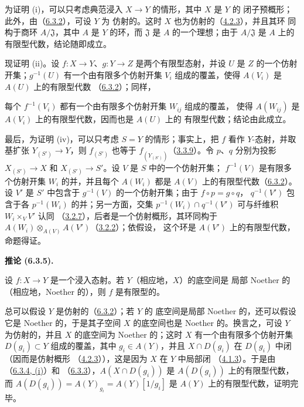 \documentclass[UTF8,fontset=none,11pt,oneside,openany]{ctexbook}
\newenvironment{corollary}[1][]{%
  \par\medskip\noindent\textbf{推论 (#1).}\ %
}{\par}
\newcommand{\oldpage}[2][]{%
  \hypertarget{ega-source-page-#1-#2}{}%
  \marginnote{\scriptsize\textbf{#1}~|~#2}\ignorespaces}
\let\EGAOriginalLabel\label
\renewcommand{\label}[1]{\phantomsection\EGAOriginalLabel{#1}}
\begin{document}
为证明 (i)，可以只考虑典范浸入 $X\to Y$ 的情形，其中 $X$ 是 $Y$ 的
闭子预概形；此外，由（\hyperref[I.6.3.2-fr]{6.3.2}），可设 $Y$ 为
仿射的。这时 $X$ 也为仿射的（\hyperref[I.4.2.3-fr]{4.2.3}），并且其环
同构于商环 $A/\mathfrak{J}$，其中 $A$ 是 $Y$ 的环，而
$\mathfrak{J}$ 是 $A$ 的一个理想；由于 $A/\mathfrak{J}$ 是 $A$ 上的
有限型代数，结论随即成立。

现证明 (ii)。设 $f:X\to Y$、$g:Y\to Z$ 是两个有限型态射，并设 $U$
是 $Z$ 的一个仿射开集；$g^{-1}(U)$ 有一个由有限多个仿射开集 $V_i$
组成的覆盖，使得 $A(V_i)$ 是 $A(U)$ 上的有限型代数
（\hyperref[I.6.3.2-fr]{6.3.2}）；同样，

\oldpage[I]{146}
每个 $f^{-1}(V_i)$ 都有一个由有限多个仿射开集 $W_{ij}$ 组成的覆盖，
使得 $A(W_{ij})$ 是 $A(V_i)$ 上的有限型代数，因而也是 $A(U)$ 上的
有限型代数；结论由此成立。

最后，为证明 (iv)，可以只考虑 $S=Y$ 的情形；事实上，把 $f$ 看作
$Y$-态射，并取基扩张 $Y_{(S')}\to Y$，则 $f_{(S')}$ 也等于
$f_{(Y_{(S')})}$（\hyperref[I.3.3.9-fr]{3.3.9}）。令 $p$、$q$ 分别为投影
$X_{(S')}\to X$ 和 $X_{(S')}\to S'$。设 $V$ 是 $S$ 中的一个仿射开集；
$f^{-1}(V)$ 是有限多个仿射开集 $W_i$ 的并，并且每个 $A(W_i)$ 都是
$A(V)$ 上的有限型代数（\hyperref[I.6.3.2-fr]{6.3.2}）。设 $V'$ 是
$S'$ 中包含于 $g^{-1}(V)$ 的一个仿射开集；由于 $f\circ p=g\circ q$，
$q^{-1}(V')$ 包含于各 $p^{-1}(W_i)$ 的并；另一方面，交集
$p^{-1}(W_i)\cap q^{-1}(V')$ 可与纤维积 $W_i\times_V V'$ 认同
（\hyperref[I.3.2.7-fr]{3.2.7}），后者是一个仿射概形，其环同构于
$A(W_i)\otimes_{A(V)}A(V')$（\hyperref[I.3.2.2-fr]{3.2.2}）；依假设，
这个环是 $A(V')$ 上的有限型代数，命题得证。

\begin{corollary}[6.3.5]
\label{I.6.3.5-fr}
设 $f:X\to Y$ 是一个浸入态射。若 $Y$（相应地，$X$）的底空间是
局部 Noether 的（相应地，Noether 的），则 $f$ 是有限型的。
\end{corollary}

总可以假设 $Y$ 是仿射的（\hyperref[I.6.3.2-fr]{6.3.2}）；若 $Y$ 的
底空间是局部 Noether 的，还可以假设它是 Noether 的，于是其子空间
$X$ 的底空间也是 Noether 的。换言之，可设 $Y$ 为仿射的，并且 $X$
的底空间为 Noether 的；这时 $X$ 有一个由有限多个仿射开集
$D(g_i)\subset Y$ 组成的覆盖，其中 $g_i\in A(Y)$，并且
$X\cap D(g_i)$ 在 $D(g_i)$ 中闭（因而是仿射概形
（\hyperref[I.4.2.3-fr]{4.2.3}）），这是因为 $X$ 在 $Y$ 中局部闭
（\hyperref[I.4.1.3-fr]{4.1.3}）。于是由
（\hyperref[I.6.3.4-fr]{6.3.4, (i)}）和
（\hyperref[I.6.3.3-fr]{6.3.3}），$A(X\cap D(g_i))$ 是
$A(D(g_i))$ 上的有限型代数，而
$A(D(g_i))=A(Y)_{g_i}=A(Y)[1/g_i]$ 是 $A(Y)$ 上的有限型代数，证明完毕。
\end{document}
